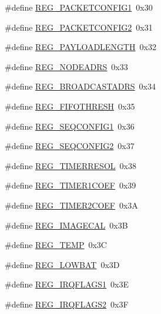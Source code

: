 \begin{DoxyCompactItemize}
\item 
\#define \hyperlink{sx1276Regs-Fsk_8h_a035c91c3eea7209c78ac5bda775940cc}{R\+E\+G\+\_\+\+P\+A\+C\+K\+E\+T\+C\+O\+N\+F\+I\+G1}~0x30
\item 
\#define \hyperlink{sx1276Regs-Fsk_8h_a519d7b5db6ab8bb6013226eaef9756c8}{R\+E\+G\+\_\+\+P\+A\+C\+K\+E\+T\+C\+O\+N\+F\+I\+G2}~0x31
\item 
\#define \hyperlink{sx1276Regs-Fsk_8h_ac1f66aa74c41653c8d30ce6b92af3769}{R\+E\+G\+\_\+\+P\+A\+Y\+L\+O\+A\+D\+L\+E\+N\+G\+TH}~0x32
\item 
\#define \hyperlink{sx1276Regs-Fsk_8h_aa62099ad5a5d4b5967f1ded180d5f685}{R\+E\+G\+\_\+\+N\+O\+D\+E\+A\+D\+RS}~0x33
\item 
\#define \hyperlink{sx1276Regs-Fsk_8h_a5c96b6f1a3e95a80f700d3a0c8ed5742}{R\+E\+G\+\_\+\+B\+R\+O\+A\+D\+C\+A\+S\+T\+A\+D\+RS}~0x34
\item 
\#define \hyperlink{sx1276Regs-Fsk_8h_a18b41b1ddfbe6eb514f74431b5d76792}{R\+E\+G\+\_\+\+F\+I\+F\+O\+T\+H\+R\+E\+SH}~0x35
\item 
\#define \hyperlink{sx1276Regs-Fsk_8h_aed3f5e12a0c953d12aacbc1146f2dde8}{R\+E\+G\+\_\+\+S\+E\+Q\+C\+O\+N\+F\+I\+G1}~0x36
\item 
\#define \hyperlink{sx1276Regs-Fsk_8h_a93a8f2fecd93790802eab65f9685dfb6}{R\+E\+G\+\_\+\+S\+E\+Q\+C\+O\+N\+F\+I\+G2}~0x37
\item 
\#define \hyperlink{sx1276Regs-Fsk_8h_a92529ed06adfae1625c5300057a88f23}{R\+E\+G\+\_\+\+T\+I\+M\+E\+R\+R\+E\+S\+OL}~0x38
\item 
\#define \hyperlink{sx1276Regs-Fsk_8h_a748e83f19ce0c442f47ff56c3ae2ae1c}{R\+E\+G\+\_\+\+T\+I\+M\+E\+R1\+C\+O\+EF}~0x39
\item 
\#define \hyperlink{sx1276Regs-Fsk_8h_a35594318e2541ff55e79e1ce8d52ab8a}{R\+E\+G\+\_\+\+T\+I\+M\+E\+R2\+C\+O\+EF}~0x3A
\item 
\#define \hyperlink{sx1276Regs-Fsk_8h_aeb557bae3e3e5ffb390a6f6a61ac686d}{R\+E\+G\+\_\+\+I\+M\+A\+G\+E\+C\+AL}~0x3B
\item 
\#define \hyperlink{sx1276Regs-Fsk_8h_ad3b0b6d8d5d3de58e5d56ce84e667b20}{R\+E\+G\+\_\+\+T\+E\+MP}~0x3C
\item 
\#define \hyperlink{sx1276Regs-Fsk_8h_afbb15f7aeaefcb5994a64fff237025f9}{R\+E\+G\+\_\+\+L\+O\+W\+B\+AT}~0x3D
\item 
\#define \hyperlink{sx1276Regs-Fsk_8h_a271d978a9b14435dc5f3d8f3ac9b8951}{R\+E\+G\+\_\+\+I\+R\+Q\+F\+L\+A\+G\+S1}~0x3E
\item 
\#define \hyperlink{sx1276Regs-Fsk_8h_ae93c6dbbf26ea297ba04cbe39c116ff3}{R\+E\+G\+\_\+\+I\+R\+Q\+F\+L\+A\+G\+S2}~0x3F

\end{DoxyCompactItemize}
